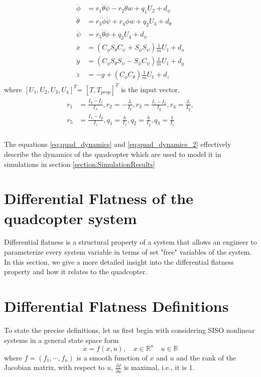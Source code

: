 \documentclass[letterpaper%
, twoside%
, 12pt%
,memoire%
, english%
,creativecommons,hyperref%
]{thETS}
\begin{document}
\begin{align}\label{eq:quad_dynamics}
\begin{aligned}
\ddot{\phi}&=r_1\dot{\theta}\dot{\psi}-r_2\dot{\theta}w+q_1U_2+d_\phi\\
\ddot{\theta}&=r_3\dot{\phi}\dot{\psi}+r_4\dot{\phi}w+
q_2U_3+d_\theta\\
\ddot{\psi}&=r_5\dot{\theta}\dot{\phi}+q_3U_4+d_\psi\\
\ddot{x}&=(C_{\phi}S_{\theta}C_{\psi}+S_{\phi}S_{\psi})\frac{1}{m}U_1+d_x\\
\ddot{y}&=(C_{\phi}S_{\theta}S_{\psi}-S_{\phi}C_{\psi})\frac{1}{m}U_1+d_y\\
\ddot{z}&=-g+(C_{\phi}C_{\theta})\frac{1}{m}U_1+d_z
\end{aligned}
\end{align}
where $[U_{1},U_{2},U_{3},U_{4}]^{T}$= $[T, T_{prop}]^T$ is the input vector.
\begin{align}\label{eq:quad_dynamics_2}
\begin{aligned}
r_{1}&=\frac{I_{y}-I_{z}}{I_{x}},
r_{2}=-\frac{J_{r}}{I_{x}},
r_{3}=\frac{I_{z}-I_{x}}{I_{y}},
r_{4}=\frac{J_{r}}{I_{y}},\\
r_{5}&=\frac{I_{x}-I_{y}}{I_{z}},
q_{1}=\frac{h}{I_{x}},
q_{2}=\frac{h}{I_{y}},
q_{3}=\frac{1}{I_{z}}
\end{aligned}
\end{align}\\
The equations \eqref{eq:quad_dynamics} and \eqref{eq:quad_dynamics_2} effectively describe the dynamics of the quadcopter which are used to model it in simulations in section \ref{section:SimulationResults}

\section{Differential Flatness of the quadcopter system}
Differential flatness is a structural property of a system that allows an engineer to parameterize every system variable in terms of set "free" variables of the system. In this section, we give a more detailed insight into the differential flatness property and how it relates to the quadcopter.

\section{Differential Flatness Definitions}
To state the precise definitions, let us first begin with considering SISO nonlinear systems in a general state space form
\begin{equation} \label{eqn:state_space}
	\dot{x}=f(x,u),\quad x\in \mathbb{R}^{n}\quad u \in \mathbb{R}
\end{equation}
where $f=(f_1,\cdots,f_n)$ is a smooth function of $x$ and $u$ and the rank of the Jacobian matrix, with respect to $u$, $\frac{\partial f}{\partial u}$ is maximal, i.e., it is $1$. 
\end{document}
